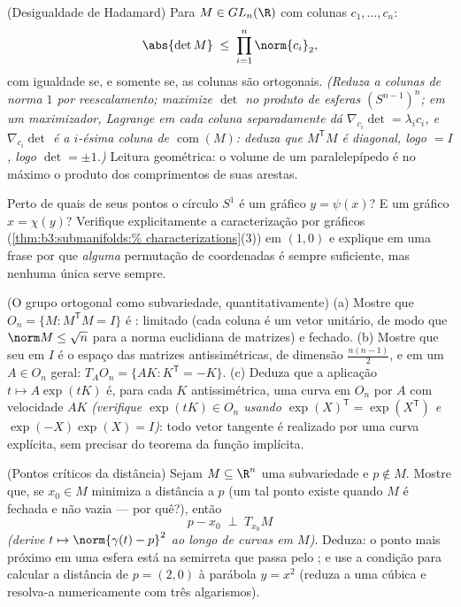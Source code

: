 \begin{exercise}[$\star\star\star$]\label{exo:b3:submanifolds:9}
(Desigualdade de Hadamard) Para $M \in GL_n(\R)$ com colunas $c_1, \dots, c_n$:
\[
\abs{\det M} \;\leq\; \prod_{i=1}^n\norm{c_i}_2 ,
\]
com igualdade se, e somente se, as colunas são ortogonais.
\emph{(Reduza a colunas de norma $1$ por reescalamento; maximize
$\det$ no produto  de esferas $(S^{n-1})^n$; em um maximizador,
Lagrange em cada coluna separadamente dá $\nabla_{c_i}\det =
\lambda_ic_i$, e $\nabla_{c_i}\det$ é a $i$-ésima
coluna de $\operatorname{com}(M)$: deduza que $M^{\mathsf T}M$ é diagonal, logo $= I$, logo
$\det = \pm1$.)} Leitura geométrica: o volume de um paralelepípedo é no máximo o
produto dos comprimentos de suas arestas.
\end{exercise}

\begin{exercise}[$\star\star$]\label{exo:b3:submanifolds:10}
Perto de quais de seus pontos o círculo $S^1$ é um gráfico $y =
\psi(x)$? E
um gráfico $x = \chi(y)$? Verifique explicitamente a caracterização por gráficos
(\cref{thm:b3:submanifolds:%
characterizations}(3)) em $(1, 0)$ e explique em uma frase por que
\emph{alguma} permutação de coordenadas é sempre suficiente, mas nenhuma
única serve sempre.
\end{exercise}

\begin{exercise}[$\star\star$]\label{exo:b3:submanifolds:11}
(O grupo ortogonal como subvariedade, quantitativamente)
(a) Mostre que $O_n = \{M : M^{\mathsf T}M = I\}$ é : limitado (cada coluna é um vetor
unitário, de modo que $\norm M \leq
\sqrt n$ para a norma euclidiana de matrizes) e
fechado.
(b) Mostre que seu  em $I$ é o espaço das matrizes
antissimétricas, de dimensão $\frac{n(n-1)}2$, e em um $A \in O_n$ geral: $T_AO_n = \{AK : K^{\mathsf T} =
-K\}$.
(c) Deduza que a aplicação $t \mapsto A\exp(tK)$ é, para cada $K$ antissimétrica, uma
curva em $O_n$ por $A$ com velocidade $AK$ \emph{(verifique
$\exp(tK) \in O_n$ usando $\exp(X)^{\mathsf T} = \exp(X^{\mathsf T})$ e $\exp(-X)\exp(X) = I$)}: todo vetor tangente é realizado por uma
curva explícita, sem precisar do teorema da função implícita.
\end{exercise}

\begin{exercise}[$\star\star$]\label{exo:b3:submanifolds:12}
(Pontos críticos da distância) Sejam $M \subseteq \R^n$ uma subvariedade e $p \notin M$.
Mostre que, se $x_0 \in M$ minimiza a distância a $p$ (um tal ponto existe
quando $M$ é fechada e não vazia --- por quê?), então
\[
p - x_0 \;\perp\; T_{x_0}M
\]
\emph{(derive $t \mapsto \norm{\gamma(t) - p}^2$ ao longo de curvas em $M$)}. Deduza: o ponto
mais próximo em uma esfera está na semirreta que passa pelo ; e
use a condição para calcular a distância de $p = (2, 0)$ à parábola $y = x^2$
(reduza a uma cúbica e resolva-a numericamente com três algarismos).
\end{exercise}


